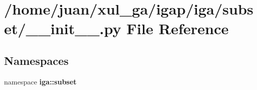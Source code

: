 \section{/home/juan/xul\_\-ga/igap/iga/subset/\_\-\_\-init\_\-\_\-.py File Reference}
\label{iga_2subset_2____init_____8py}
\subsection*{Namespaces}
\begin{CompactItemize}
\item 
namespace {\bf iga::subset}
\end{CompactItemize}
